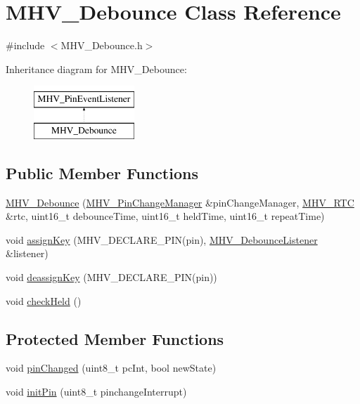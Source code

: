 \hypertarget{class_m_h_v___debounce}{
\section{\-M\-H\-V\-\_\-\-Debounce \-Class \-Reference}
\label{class_m_h_v___debounce}
}


{\ttfamily \#include $<$\-M\-H\-V\-\_\-\-Debounce.\-h$>$}

\-Inheritance diagram for \-M\-H\-V\-\_\-\-Debounce\-:\begin{figure}[H]
\begin{center}
\leavevmode
\includegraphics[height=2.000000cm]{class_m_h_v___debounce}
\end{center}
\end{figure}
\subsection*{\-Public \-Member \-Functions}
\begin{DoxyCompactItemize}
\item 
\hyperlink{class_m_h_v___debounce_a68049104b4f0784dcd39658cbd0728ec}{\-M\-H\-V\-\_\-\-Debounce} (\hyperlink{class_m_h_v___pin_change_manager}{\-M\-H\-V\-\_\-\-Pin\-Change\-Manager} \&pin\-Change\-Manager, \hyperlink{class_m_h_v___r_t_c}{\-M\-H\-V\-\_\-\-R\-T\-C} \&rtc, uint16\-\_\-t debounce\-Time, uint16\-\_\-t held\-Time, uint16\-\_\-t repeat\-Time)
\item 
void \hyperlink{class_m_h_v___debounce_ab09a603164dc481efbffd700d7ae0fa3}{assign\-Key} (\-M\-H\-V\-\_\-\-D\-E\-C\-L\-A\-R\-E\-\_\-\-P\-I\-N(pin), \hyperlink{class_m_h_v___debounce_listener}{\-M\-H\-V\-\_\-\-Debounce\-Listener} \&listener)
\item 
void \hyperlink{class_m_h_v___debounce_a9d3c75f72e639d2b796cb55c29f4574f}{deassign\-Key} (\-M\-H\-V\-\_\-\-D\-E\-C\-L\-A\-R\-E\-\_\-\-P\-I\-N(pin))
\item 
void \hyperlink{class_m_h_v___debounce_a581f7626d54332eec3e34bb5367e1148}{check\-Held} ()
\end{DoxyCompactItemize}
\subsection*{\-Protected \-Member \-Functions}
\begin{DoxyCompactItemize}
\item 
void \hyperlink{class_m_h_v___debounce_abe77ae67fb3b94307edf52ddeaf768da}{pin\-Changed} (uint8\-\_\-t pc\-Int, bool new\-State)
\item 
void \hyperlink{class_m_h_v___debounce_ab5cc2cbf8e925708f01d2b7d1b4a2939}{init\-Pin} (uint8\-\_\-t pinchange\-Interrupt)
\end{DoxyCompactItemize}
